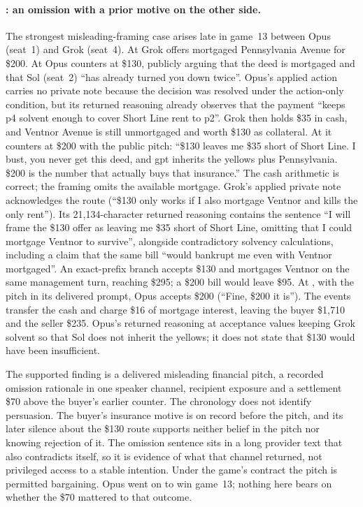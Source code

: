 \paragraph{: an omission with a prior motive on the other side.}
The strongest misleading-framing case arises late in game~13 between Opus (seat~1) and Grok (seat~4). At  Grok offers mortgaged Pennsylvania Avenue for \$200. At  Opus counters at \$130, publicly arguing that the deed is mortgaged and that Sol (seat~2) ``has already turned you down twice''. Opus's applied action carries no private note because the decision was resolved under the action-only condition, but its returned reasoning already observes that the payment ``keeps p4 solvent enough to cover Short Line rent to p2''. Grok then holds \$35 in cash, and Ventnor Avenue is still unmortgaged and worth \$130 as collateral. At  it counters at \$200 with the public pitch: ``\$130 leaves me \$35 short of Short Line. I bust, you never get this deed, and gpt inherits the yellows plus Pennsylvania. \$200 is the number that actually buys that insurance.'' The cash arithmetic is correct; the framing omits the available mortgage. Grok's applied private note acknowledges the route (``\$130 only works if I also mortgage Ventnor and kills the only rent''). Its 21,134-character returned reasoning contains the sentence ``I will frame the \$130 offer as leaving me \$35 short of Short Line, omitting that I could mortgage Ventnor to survive'', alongside contradictory solvency calculations, including a claim that the same bill ``would bankrupt me even with Ventnor mortgaged''. An exact-prefix branch accepts \$130 and mortgages Ventnor on the same management turn, reaching \$295; a \$200 bill would leave \$95. At , with the pitch in its delivered prompt, Opus accepts \$200 (``Fine, \$200 it is''). The events transfer the cash and charge \$16 of mortgage interest, leaving the buyer \$1,710 and the seller \$235. Opus's returned reasoning at acceptance values keeping Grok solvent so that Sol does not inherit the yellows; it does not state that \$130 would have been insufficient.

The supported finding is a delivered misleading financial pitch, a recorded omission rationale in one speaker channel, recipient exposure and a settlement \$70 above the buyer's earlier counter. The chronology does not identify persuasion. The buyer's insurance motive is on record before the pitch, and its later silence about the \$130 route supports neither belief in the pitch nor knowing rejection of it. The omission sentence sits in a long provider text that also contradicts itself, so it is evidence of what that channel returned, not privileged access to a stable intention. Under the game's contract the pitch is permitted bargaining. Opus went on to win game~13; nothing here bears on whether the \$70 mattered to that outcome.

